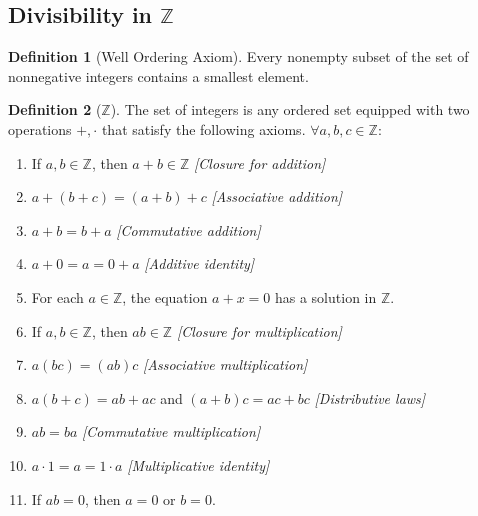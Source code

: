 \documentclass{article}
\theoremstyle{definition}
\newtheorem{definition}{Definition}[section]
\theoremstyle{remark}
\begin{document}
\subsection{Divisibility in $\mathbb{Z}$}




\begin{definition}[Well Ordering Axiom]
Every nonempty subset of the set of nonnegative integers contains a smallest element. 
\end{definition}

\begin{definition}[$\mathbb{Z}$]
The set of integers is any ordered set equipped with two operations $+, \cdot$ that satisfy the following axioms. $\forall a,b,c \in \mathbb{Z}:$
\begin{enumerate}
\item If $a, b \in \mathbb{Z}$, then $a + b \in \mathbb{Z}$ \hfill \textit{[Closure for addition]}
\item $a + (b + c) = (a + b) + c$ \hfill \textit{[Associative addition]}
\item $a + b = b + a$ \hfill \textit{[Commutative addition]}
\item $a + 0 = a = 0 + a$ \hfill \textit{[Additive identity]}
\item For each $a \in \mathbb{Z}$, the equation $a + x = 0$ has a solution in $\mathbb{Z}$.
\item If $a, b \in \mathbb{Z}$, then $ab \in \mathbb{Z}$ \hfill \textit{[Closure for multiplication]}
\item $a(bc) = (ab)c$ \hfill \textit{[Associative multiplication]}
\item $a(b + c) = ab + ac$ and \newline
\hspace{0.5cm} $(a + b)c = ac + bc$ \hfill \textit{[Distributive laws]}
\item $ab = ba$ \hfill \textit{[Commutative multiplication]}
\item $a \cdot 1 = a = 1 \cdot a$ \hfill \textit{[Multiplicative identity]}
\item If $ab = 0$, then $a = 0$ or $b = 0$.








\end{enumerate}

\end{definition}
\end{document}
